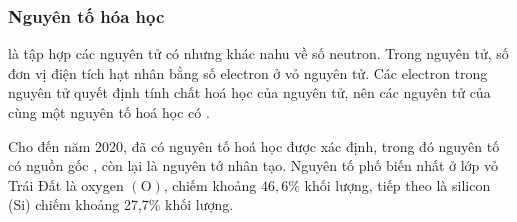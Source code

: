 \subsubsection{Nguyên tố hóa học}
\begin{paracol}{2}
	\vspace{0.5cm}
	\begin{tomtat}
		 là tập hợp các nguyên tử có  nhưng khác nahu về số neutron. Trong nguyên tử, số đơn vị điện tích hạt nhân bằng số electron ở vỏ nguyên tử. Các electron trong nguyên tử quyết định tính chất hoá học của nguyên tử, nên các nguyên tử của cùng một nguyên tố hoá học có .
	\end{tomtat}
	\switchcolumn
	\begin{Bancobiet}
		Cho đến năm 2020, đã có  nguyên tố hoá học được xác định, trong đó  nguyên tố có nguồn gốc , còn lại là nguyên tớ nhân tạo. Nguyên tố phố biến nhất ở lớp vỏ Trái Đất là oxygen $(\mathrm{O})$, chiếm khoảng $46,6 \%$ khối lượng, tiếp theo là silicon (Si) chiếm khoảng 27,7\% khối lượng.
	\end{Bancobiet}
\end{paracol}

